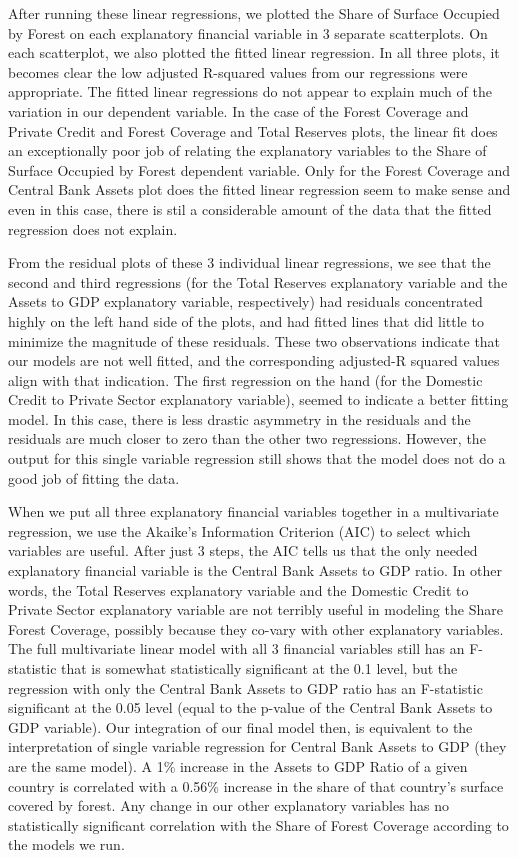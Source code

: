 \documentclass[
  12pt,
]{article}
\begin{document}
After running these linear regressions, we plotted the Share of Surface
Occupied by Forest on each explanatory financial variable in 3 separate
scatterplots. On each scatterplot, we also plotted the fitted linear
regression. In all three plots, it becomes clear the low adjusted
R-squared values from our regressions were appropriate. The fitted
linear regressions do not appear to explain much of the variation in our
dependent variable. In the case of the Forest Coverage and Private
Credit and Forest Coverage and Total Reserves plots, the linear fit does
an exceptionally poor job of relating the explanatory variables to the
Share of Surface Occupied by Forest dependent variable. Only for the
Forest Coverage and Central Bank Assets plot does the fitted linear
regression seem to make sense and even in this case, there is stil a
considerable amount of the data that the fitted regression does not
explain.

From the residual plots of these 3 individual linear regressions, we see
that the second and third regressions (for the Total Reserves
explanatory variable and the Assets to GDP explanatory variable,
respectively) had residuals concentrated highly on the left hand side of
the plots, and had fitted lines that did little to minimize the
magnitude of these residuals. These two observations indicate that our
models are not well fitted, and the corresponding adjusted-R squared
values align with that indication. The first regression on the hand (for
the Domestic Credit to Private Sector explanatory variable), seemed to
indicate a better fitting model. In this case, there is less drastic
asymmetry in the residuals and the residuals are much closer to zero
than the other two regressions. However, the output for this single
variable regression still shows that the model does not do a good job of
fitting the data.

When we put all three explanatory financial variables together in a
multivariate regression, we use the Akaike's Information Criterion (AIC)
to select which variables are useful. After just 3 steps, the AIC tells
us that the only needed explanatory financial variable is the Central
Bank Assets to GDP ratio. In other words, the Total Reserves explanatory
variable and the Domestic Credit to Private Sector explanatory variable
are not terribly useful in modeling the Share Forest Coverage, possibly
because they co-vary with other explanatory variables. The full
multivariate linear model with all 3 financial variables still has an
F-statistic that is somewhat statistically significant at the 0.1 level,
but the regression with only the Central Bank Assets to GDP ratio has an
F-statistic significant at the 0.05 level (equal to the p-value of the
Central Bank Assets to GDP variable). Our integration of our final model
then, is equivalent to the interpretation of single variable regression
for Central Bank Assets to GDP (they are the same model). A 1\% increase
in the Assets to GDP Ratio of a given country is correlated with a
0.56\% increase in the share of that country's surface covered by
forest. Any change in our other explanatory variables has no
statistically significant correlation with the Share of Forest Coverage
according to the models we run.
\end{document}
